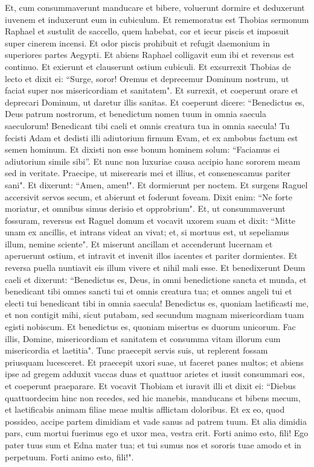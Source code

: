 \begin{biblechapter}  
\verse Et, cum consummaverunt manducare et bibere, voluerunt dormire et deduxerunt iuvenem et induxerunt eum in cubiculum. 
\verse Et rememoratus est Thobias sermonum Raphael et sustulit de saccello, quem habebat, cor et iecur piscis et imposuit super cinerem incensi. 
\verse Et odor piscis prohibuit et refugit daemonium in superiores partes Aegypti. Et abiens Raphael colligavit eum ibi et reversus est continuo. 
\verse Et exierunt et clauserunt ostium cubiculi. Et exsurrexit Thobias de lecto et dixit ei: “Surge, soror! Oremus et deprecemur Dominum nostrum, ut faciat super nos misericordiam et sanitatem". 
\verse Et surrexit, et coeperunt orare et deprecari Dominum, ut daretur illis sanitas. Et coeperunt dicere: “Benedictus es, Deus patrum nostrorum, et benedictum nomen tuum in omnia saecula saeculorum! Benedicant tibi caeli et omnis creatura tua in omnia saecula! 
\verse Tu fecisti Adam et dedisti illi adiutorium firmum Evam, et ex ambobus factum est semen hominum. Et dixisti non esse bonum hominem solum: “Faciamus ei adiutorium simile sibi”. 
\verse Et nunc non luxuriae causa accipio hanc sororem meam sed in veritate. Praecipe, ut miserearis mei et illius, et consenescamus pariter sani". 
\verse Et dixerunt: “Amen, amen!". 
\verse Et dormierunt per noctem. Et surgens Raguel accersivit servos secum, et abierunt et foderunt foveam.  
\verse Dixit enim: “Ne forte moriatur, et omnibus simus derisio et opprobrium". 
\verse Et, ut consummaverunt fossuram, reversus est Raguel domum et vocavit uxorem suam 
\verse et dixit: “Mitte unam ex ancillis, et intrans videat an vivat; et, si mortuus est, ut sepeliamus illum, nemine sciente". 
\verse Et miserunt ancillam et accenderunt lucernam et aperuerunt ostium, et intravit et invenit illos iacentes et pariter dormientes. 
\verse Et reversa puella nuntiavit eis illum vivere et nihil mali esse. 
\verse Et benedixerunt Deum caeli et dixerunt: “Benedictus es, Deus, in omni benedictione sancta et munda, et benedicant tibi omnes sancti tui et omnis creatura tua; et omnes angeli tui et electi tui benedicant tibi in omnia saecula! 
\verse Benedictus es, quoniam laetificasti me, et non contigit mihi, sicut putabam, sed secundum magnam misericordiam tuam egisti nobiscum. 
\verse Et benedictus es, quoniam misertus es duorum unicorum. Fac illis, Domine, misericordiam et sanitatem et consumma vitam illorum cum misericordia et laetitia". 
\verse Tunc praecepit servis suis, ut replerent fossam priusquam lucesceret. 
\verse Et praecepit uxori suae, ut faceret panes multos; et abiens ipse ad gregem adduxit vaccas duas et quattuor arietes et iussit consummari eos, et coeperunt praeparare. 
\verse Et vocavit Thobiam et iuravit illi et dixit ei: “Diebus quattuordecim hinc non recedes, sed hic manebis, manducans et bibens mecum, et laetificabis animam filiae meae multis afflictam doloribus. 
\verse Et ex eo, quod possideo, accipe partem dimidiam et vade sanus ad patrem tuum. Et alia dimidia pars, cum mortui fuerimus ego et uxor mea, vestra erit. Forti animo esto, fili! Ego pater tuus sum et Edna mater tua; et tui sumus nos et sororis tuae amodo et in perpetuum. Forti animo esto, fili!". 
\end{biblechapter}

